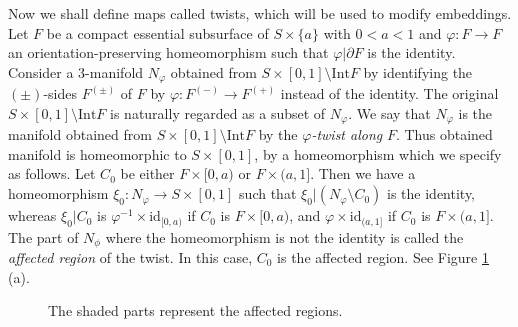 \documentclass{amsart}
\theoremstyle{definition}
\numberwithin{figure}{section}
\numberwithin{equation}{section}
\def\part{\partial}
\def\Int{\mathrm{Int}}
\begin{document}
Now we shall define maps called   twists, which will be used to modify embeddings.
Let $F$ be a compact essential subsurface of $S\times \{a\}$ with $0<a<1$ and $\varphi:F\rightarrow F$ an orientation-preserving homeomorphism 
such that $\varphi|\part F$ is the identity.
Consider a 3-manifold $N_\varphi$ obtained from $S\times [0,1]\setminus \Int F$ by identifying the $(\pm)$-sides 
$F^{(\pm)}$ of $F$ by $\varphi:F^{(-)}\rightarrow F^{(+)}$ instead of the identity.
The original $S\times [0,1]\setminus \Int F$ is naturally regarded as a subset of $N_\varphi$. 
We say that $N_\varphi$ is the manifold obtained from $S\times [0,1]\setminus \Int F$ by the \emph{$\varphi$-twist along} $F$.
Thus obtained manifold is homeomorphic to $S \times [0,1]$, by a homeomorphism which we specify as follows.
Let $C_0$ be either $F \times [0,a)$ or $F \times (a,1]$.
Then we have a homeomorphism $\xi_0:N_\varphi\rightarrow S\times [0,1]$ such that   $\xi_0|(N_\varphi\setminus 
C_0)$ is the identity, whereas $\xi_0|C_0$ is $\varphi ^{-1} \times \mathrm{id}_{[0,a)}$ if $C_0$ is $F \times [0,a)$, and $\varphi \times \mathrm{id}_{(a,1]}$ if $C_0$ is $F \times (a,1]$.
The part of $N_\phi$ where the homeomorphism is not the identity is called the \emph{affected region} of the twist.
In this case, $C_0$ is the affected region.
See Figure \ref{fig2_3}\,(a).
\begin{figure}[hbtp]
\centering
{}
\caption{The shaded parts represent the affected regions.}
\label{fig2_3}
\end{figure}
\end{document}
